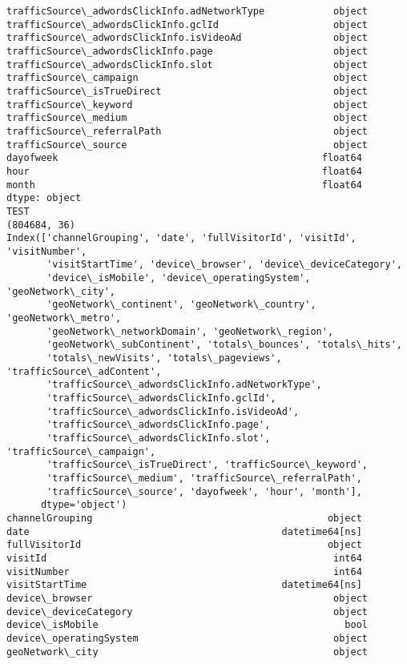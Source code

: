 \documentclass[11pt]{article}
\begin{document}
\begin{Verbatim}[commandchars=\\\{\}]
trafficSource\_adwordsClickInfo.adNetworkType            object
trafficSource\_adwordsClickInfo.gclId                    object
trafficSource\_adwordsClickInfo.isVideoAd                object
trafficSource\_adwordsClickInfo.page                     object
trafficSource\_adwordsClickInfo.slot                     object
trafficSource\_campaign                                  object
trafficSource\_isTrueDirect                              object
trafficSource\_keyword                                   object
trafficSource\_medium                                    object
trafficSource\_referralPath                              object
trafficSource\_source                                    object
dayofweek                                              float64
hour                                                   float64
month                                                  float64
dtype: object
TEST
(804684, 36)
Index(['channelGrouping', 'date', 'fullVisitorId', 'visitId', 'visitNumber',
       'visitStartTime', 'device\_browser', 'device\_deviceCategory',
       'device\_isMobile', 'device\_operatingSystem', 'geoNetwork\_city',
       'geoNetwork\_continent', 'geoNetwork\_country', 'geoNetwork\_metro',
       'geoNetwork\_networkDomain', 'geoNetwork\_region',
       'geoNetwork\_subContinent', 'totals\_bounces', 'totals\_hits',
       'totals\_newVisits', 'totals\_pageviews', 'trafficSource\_adContent',
       'trafficSource\_adwordsClickInfo.adNetworkType',
       'trafficSource\_adwordsClickInfo.gclId',
       'trafficSource\_adwordsClickInfo.isVideoAd',
       'trafficSource\_adwordsClickInfo.page',
       'trafficSource\_adwordsClickInfo.slot', 'trafficSource\_campaign',
       'trafficSource\_isTrueDirect', 'trafficSource\_keyword',
       'trafficSource\_medium', 'trafficSource\_referralPath',
       'trafficSource\_source', 'dayofweek', 'hour', 'month'],
      dtype='object')
channelGrouping                                         object
date                                            datetime64[ns]
fullVisitorId                                           object
visitId                                                  int64
visitNumber                                              int64
visitStartTime                                  datetime64[ns]
device\_browser                                          object
device\_deviceCategory                                   object
device\_isMobile                                           bool
device\_operatingSystem                                  object
geoNetwork\_city                                         object

\end{Verbatim}
\end{document}
